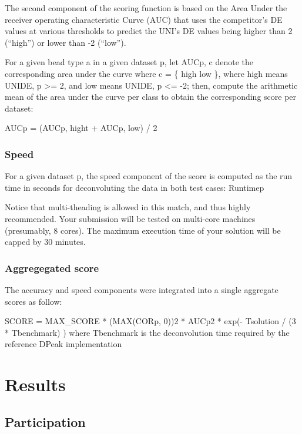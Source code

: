 \documentclass[]{article}
\begin{document}
The second component of the scoring function is based on the Area Under
the receiver operating characteristic Curve (AUC) that uses the
competitor's DE values at various thresholds to predict the UNI's DE
values being higher than 2 (``high'') or lower than -2 (``low'').

For a given bead type a in a given dataset p, let AUCp, c denote the
corresponding area under the curve where c = \{ high \textbar{} low \},
where high means UNIDE, p \textgreater{}= 2, and low means UNIDE, p
\textless{}= -2; then, compute the arithmetic mean of the area under the
curve per class to obtain the corresponding score per dataset:

AUCp = (AUCp, hight + AUCp, low) / 2

\hypertarget{speed}{%
\subsubsection{Speed}\label{speed}}

For a given dataset p, the speed component of the score is computed as
the run time in seconds for deconvoluting the data in both test cases:
Runtimep

Notice that multi-theading is allowed in this match, and thus highly
recommended. Your submission will be tested on multi-core machines
(presumably, 8 cores). The maximum execution time of your solution will
be capped by 30 minutes.

\hypertarget{aggregegated-score}{%
\subsubsection{Aggregegated score}\label{aggregegated-score}}

The accuracy and speed components were integrated into a single
aggregate scores as follow:

SCORE = MAX\_SCORE * (MAX(CORp, 0))2 * AUCp2 * exp(- Tsolution / (3 *
Tbenchmark) ) where Tbenchmark is the deconvolution time required by the
reference DPeak implementation

\hypertarget{results}{%
\section{Results}\label{results}}

\hypertarget{participation}{%
\subsection{Participation}\label{participation}}
\end{document}
